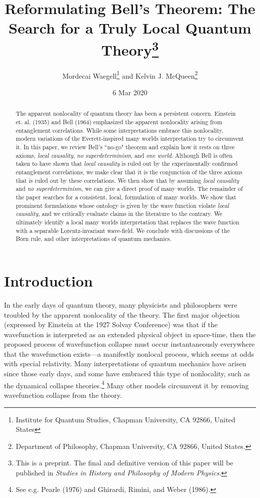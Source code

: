 \documentclass[12pt]{article}
\title{Reformulating Bell's Theorem: The Search for a Truly Local Quantum Theory\thanks{This is a preprint. The final and definitive version of this paper will be published in \textit{Studies in History and Philosophy of Modern Physics}.}}
\author{Mordecai Waegell\thanks{Institute for Quantum Studies, Chapman University, CA 92866, United States} \space and Kelvin J. McQueen\thanks{Department of Philosophy, Chapman University, CA 92866, United States.}}
\date{6 Mar 2020}
\begin{document}
\maketitle

\begin{abstract}
The apparent nonlocality of quantum theory has been a persistent concern. Einstein et. al. (1935) and Bell (1964) emphasized the apparent nonlocality arising from entanglement correlations. While some interpretations embrace this nonlocality, modern variations of the Everett-inspired many worlds interpretation try to circumvent it. In this paper, we review Bell's ``no-go" theorem and explain how it rests on three axioms, \textit{local causality}, \textit{no superdeterminism}, and \textit{one world}. Although Bell is often taken to have shown that \textit{local causality} is ruled out by the experimentally confirmed entanglement correlations, we make clear that it is the conjunction of the three axioms that is ruled out by these correlations. We then show that by assuming \textit{local causality} and \textit{no superdeterminism}, we can give a direct proof of many worlds. The remainder of the paper searches for a consistent, local, formulation of many worlds. We show that prominent formulations whose ontology is given by the wave function violate \textit{local causality}, and we critically evaluate claims in the literature to the contrary.  We ultimately identify a local many worlds interpretation that replaces the wave function with a separable Lorentz-invariant wave-field.  We conclude with discussions of the Born rule, and other interpretations of quantum mechanics.


\end{abstract}

\newpage
\tableofcontents

\newpage
\section{Introduction}

In the early days of quantum theory, many physicists and philosophers were troubled by the apparent nonlocality of the theory.  The first major objection (expressed by Einstein at the 1927 Solvay Conference) was that if the wavefunction is interpreted as an extended physical object in space-time, then the proposed process of wavefunction collapse must occur instantaneously everywhere that the wavefunction exists---a manifestly nonlocal process, which seems at odds with special relativity. Many interpretations of quantum mechanics have arisen since those early days, and some have embraced this type of nonlocality, such as the dynamical collapse theories.\footnote{See e.g. Pearle (1976) and Ghirardi, Rimini, and Weber (1986).} Many other models circumvent it by removing wavefunction collapse from the theory. 
\end{document}
